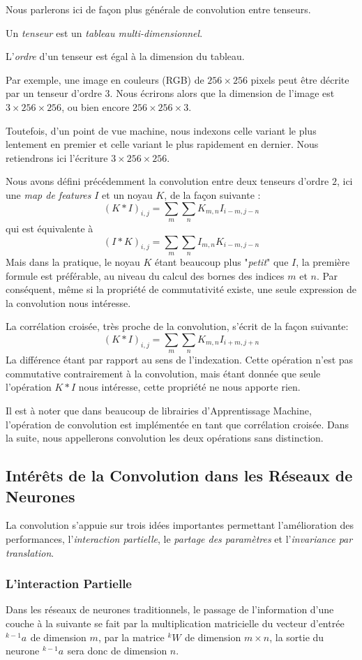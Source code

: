 \documentclass[a4paper, 11pt]{report}
\newcommand{\lexp}[1]{\phantom{}^{#1}}
\newcommand{\elem}[4]{\lexp{#2}#1^{#3}_{#4}}
\begin{document}
Nous parlerons ici de façon plus générale de convolution entre tenseurs.
\begin{center}
	Un \emph{tenseur} est un \emph{tableau multi-dimensionnel}.
	
	L'\emph{ordre} d'un tenseur est égal à la dimension du tableau.
\end{center}
Par exemple, une image en couleurs (RGB) de $256 \times 256$ pixels peut être décrite par un tenseur d'ordre $3$.
Nous écrirons alors que la dimension de l'image est $3 \times 256 \times 256$, ou bien encore $256 \times 256 \times 3$.

Toutefois, d'un point de vue machine, nous indexons celle variant le plus lentement en premier et celle variant le plus rapidement en dernier. Nous retiendrons ici l'écriture $3 \times 256 \times 256$.

Nous avons défini précédemment la convolution entre deux tenseurs d'ordre $2$, ici une \emph{map de features} $I$ et un noyau $K$, de la façon suivante :
$$(K*I)_{i,j} = \sum_{m}\sum_{n}{K_{m,n}I_{i-m,j-n}}$$
qui est équivalente à 
$$(I*K)_{i,j} = \sum_{m}\sum_{n}{I_{m,n}K_{i-m,j-n}}$$
Mais dans la pratique, le noyau $K$ étant beaucoup plus "\emph{petit}" que $I$, la première formule est préférable, au niveau du calcul des bornes des indices $m$ et $n$.
Par conséquent, même si la propriété de commutativité existe, une seule expression de la convolution nous intéresse.

La corrélation croisée, très proche de la convolution, s'écrit de la façon suivante:
$$(K*I)_{i,j} = \sum_{m}\sum_{n}{K_{m,n}I_{i+m,j+n}}$$
La différence étant par rapport au sens de l'indexation. Cette opération n'est pas commutative contrairement à la convolution, mais étant donnée que seule l'opération $K*I$ nous intéresse, cette propriété ne nous apporte rien.

Il est à noter que dans beaucoup de librairies d'Apprentissage Machine, l'opération de convolution est implémentée en tant que corrélation croisée. Dans la suite, nous appellerons convolution les deux opérations sans distinction.
			
\subsection{Intérêts de la Convolution dans les Réseaux de Neurones}
La convolution s'appuie sur trois idées importantes permettant l'amélioration des performances, l'\emph{interaction partielle}, le \emph{partage des paramètres} et l'\emph{invariance par translation}.
\subsubsection{L'interaction Partielle}
Dans les réseaux de neurones traditionnels, le passage de l'information d'une couche à la suivante se fait par la multiplication matricielle du vecteur d'entrée $\elem{a}{k-1}{}{}$ de dimension $m$, par la matrice $\elem{W}{k}{}{}$ de dimension $m \times n$, la sortie du neurone $\elem{a}{k-1}{}{}$ sera donc de dimension $n$.
\end{document}
